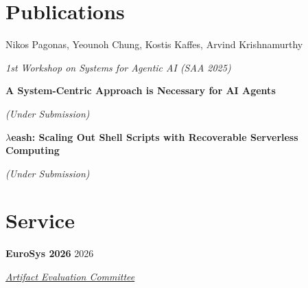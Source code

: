 \documentclass[margin,12pt]{resume}
\newcommand{\cvName}{Nikos Pagonas}
\newcommand{\subsectionVSpace}{\vspace{3.5ex}\xspace}
\newcommand{\sectionVSpace}{\vspace{1ex}\xspace} %
\newcommand{\sectionVSpaceCorrection}{\vspace{-3.5ex}} %
\newcommand{\header}[1]{\textbf{#1}\xspace}
\newcommand{\authors}[1]{#1\xspace}
\newcommand{\equalContributionNote}{(*equal contribution)\xspace}
\newcommand{\me}{\cvName\xspace}
\newcommand{\ordinal}[1]{\textsuperscript{#1}\xspace}
\newcommand{\paperTitle}[1]{\header{#1}\xspace}
\newcommand{\role}[1]{\textit{#1}\xspace}
\newcommand{\service}[1]{\header{#1}\xspace}
\newcommand{\underSubmission}{\textit{(Under Submission)}\xspace}
\newcommand{\venue}[1]{\textit{#1}\xspace}
\newenvironment{rSubsection}{}{\par\subsectionVSpace}
\newenvironment{rSection}[1]{\sectionVSpaceCorrection\section{#1}\xspace}{\sectionVSpace\par}
\begin{document}
\begin{resume}
\begin{rSection}{Publications}
\begin{rSubsection}
            \authors{\me, Yeounoh Chung, Kostis Kaffes, Arvind Krishnamurthy}

            \venue{1st Workshop on Systems for Agentic AI (SAA 2025)}
        \end{rSubsection}

        \begin{rSubsection}
            \paperTitle{A System-Centric Approach is Necessary for AI Agents}

            \underSubmission


        \end{rSubsection}

        \begin{rSubsection}
            \paperTitle{\( \lambda \)eash: Scaling Out Shell Scripts with Recoverable Serverless Computing}

            \underSubmission


        \end{rSubsection}




    \end{rSection}

    \begin{rSection}{Service}
        \begin{rSubsection}
            \service{EuroSys 2026} \hfill 2026

            \role{\href{https://sysartifacts.github.io/eurosys2026/organizers}{Artifact Evaluation Committee}}
        \end{rSubsection}


\end{rSection}
\end{resume}
\end{document}
